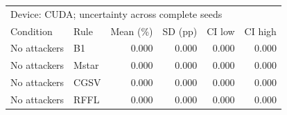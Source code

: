 \begin{tabular}{llrrrr}
\toprule
\multicolumn{6}{l}{Device: CUDA; uncertainty across complete seeds} \\
Condition & Rule & Mean (\%) & SD (pp) & CI low & CI high \\
\midrule
No attackers & B1 & 0.000 & 0.000 & 0.000 & 0.000 \\
No attackers & Mstar & 0.000 & 0.000 & 0.000 & 0.000 \\
No attackers & CGSV & 0.000 & 0.000 & 0.000 & 0.000 \\
No attackers & RFFL & 0.000 & 0.000 & 0.000 & 0.000 \\
\bottomrule
\end{tabular}
